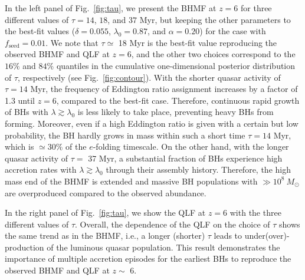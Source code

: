 \documentclass[twocolumn, twocolappendix]{aastex63}
\newcommand{\Msun}{M_\odot}
\newcommand{\tlife}{\tau}
\newcommand{\fseed}{f_\mathrm{seed}}
\begin{document}
\begin{CJK*}{UTF8}{gbsn}
In the left panel of Fig.~\ref{fig:tau}, we present the BHMF at $z=6$ for three different values of $\tlife=14$, $18$, and $37$ Myr,
but keeping the other parameters to the best-fit values ($\delta=0.055$, $\lambda_0=0.87$, and $\alpha=0.20$) for the case with $\fseed=0.01$.
We note that $\tlife \simeq$ 18 Myr is the best-fit value reproducing the observed BHMF and QLF at $z=6$,
and the other two choices correspond to the $16\%$ and $84\%$ quantiles in the cumulative one-dimensional posterior distribution of $\tau$, respectively (see Fig.~\ref{fig:contour}).
With the shorter quasar activity of $\tlife=14$ Myr, the frequency of Eddington ratio assignment increases by a factor of 1.3 until $z=6$, compared to the best-fit case.
Therefore, continuous rapid growth of BHs with $\lambda \gtrsim \lambda_0$ is less likely to take place,
preventing heavy BHs from forming.
Moreover, even if a high Eddington ratio is given with a certain but low probability, the BH hardly grows in mass within such a short time $\tlife=14$ Myr,
which is $\simeq 30\%$ of the $e$-folding timescale.
On the other hand, with the longer quasar activity of $\tlife=$ 37 Myr, a substantial fraction of BHs experience high accretion rates with $\lambda\gtrsim \lambda_0$
through their assembly history.
Therefore, the high mass end of the BHMF is extended and massive BH populations with $\gg 10^8~\Msun$ are overproduced compared to the observed abundance.

In the right panel of Fig.~\ref{fig:tau}, we show the QLF at $z=6$ with the three different values of $\tau$.
Overall, the dependence of the QLF on the choice of $\tau$ shows the same trend as in the BHMF,
i.e., a longer (shorter) $\tlife$ leads to under(over)-production of the luminous quasar population.
This result demonstrates the importance of multiple accretion episodes for the earliest BHs to
reproduce the observed BHMF and QLF at $z\sim$ 6.





{}




\end{CJK*}
\end{document}
